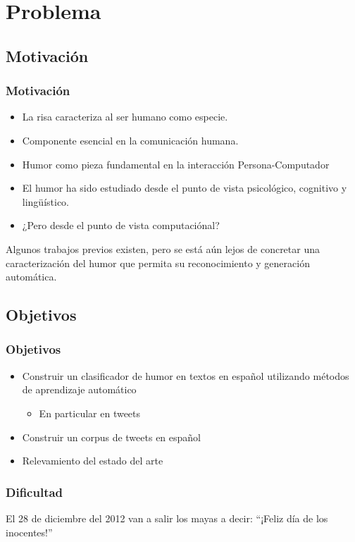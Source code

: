 \section{Problema} 

\subsection{Motivación}

\begin{frame}[allowframebreaks]
    \frametitle{Motivación}
    \begin{itemize}
        \item La risa caracteriza al ser humano como especie.
        \item Componente esencial en la comunicación humana.
        \item Humor como pieza fundamental en la interacción Persona-Computador
    \end{itemize}
    \framebreak
    \begin{itemize}
        \item El humor ha sido estudiado desde el punto de vista psicológico, cognitivo y lingüístico.
        \item ¿Pero desde el punto de vista computaciónal?
    \end{itemize}
    Algunos trabajos previos existen, pero se está aún lejos de concretar una caracterización del humor que permita su reconocimiento y generación automática.
\end{frame}

\subsection{Objetivos}

\begin{frame}
    \frametitle{Objetivos}
    \begin{itemize}
        \item Construir un clasificador de humor en textos en español utilizando métodos de aprendizaje automático
            \begin{itemize}
                \item En particular en tweets
            \end{itemize}
        \item Construir un corpus de tweets en español
        \item Relevamiento del estado del arte
    \end{itemize}
\end{frame}


\begin{frame}
    \frametitle{Dificultad}
    El 28 de diciembre del 2012 van a salir los mayas a decir: ``¡Feliz día de los inocentes!''
\end{frame}
